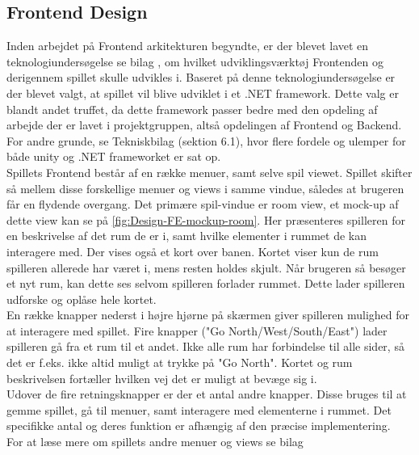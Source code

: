 \subsection{Frontend Design}
\label{ssec:FE Design}

Inden arbejdet på Frontend arkitekturen begyndte, er der blevet lavet en teknologiundersøgelse se bilag \parencite[][Section 6]{TekniskBilag}, om hvilket udviklingsværktøj Frontenden og derigennem spillet skulle udvikles i. Baseret på denne teknologiundersøgelse er der blevet valgt, at spillet vil blive udviklet i et .NET framework. Dette valg er blandt andet truffet, da dette framework passer bedre med den opdeling af arbejde der er lavet i projektgruppen, altså opdelingen af Frontend og Backend. For andre grunde, se Tekniskbilag (sektion 6.1), hvor flere fordele og ulemper for både unity og .NET frameworket er sat op.\\

\noindent Spillets Frontend består af en række menuer, samt selve spil viewet. Spillet skifter så mellem disse forskellige menuer og views i samme vindue, således at brugeren får en flydende overgang.
Det primære spil-vindue er room view, et mock-up af dette view kan se på \autoref{fig:Design-FE-mockup-room}. Her præsenteres spilleren for en beskrivelse af det rum de er i, samt hvilke elementer i rummet de kan interagere med. Der vises også et kort over banen. Kortet viser kun de rum spilleren allerede har været i, mens resten holdes skjult. Når brugeren så besøger et nyt rum, kan dette ses selvom spilleren forlader rummet. Dette lader spilleren udforske og oplåse hele kortet.\\
En række knapper nederst i højre hjørne på skærmen giver spilleren mulighed for at interagere med spillet. Fire knapper ("Go {North/West/South/East}") lader spilleren gå fra et rum til et andet. Ikke alle rum har forbindelse til alle sider, så det er f.eks. ikke altid muligt at trykke på "Go North". Kortet og rum beskrivelsen fortæller hvilken vej det er muligt at bevæge sig i.\\
Udover de fire retningsknapper er der et antal andre knapper. Disse bruges til at gemme spillet, gå til menuer, samt interagere med elementerne i rummet. Det specifikke antal og deres funktion er afhængig af den præcise implementering.\\

\noindent For at læse mere om spillets andre menuer og views se bilag \parencite[][Section 7]{TekniskBilag}

